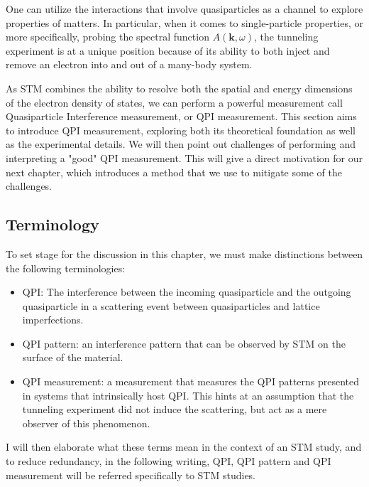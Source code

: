 One can utilize the interactions that involve quasiparticles as a channel to explore properties of matters. In particular, when it comes to single-particle properties, or more specifically, probing the spectral function $A(\textbf{k},\omega)$, the tunneling experiment is at a unique position because of its ability to both inject and remove an electron into and out of a many-body system.  

As \ac{STM} combines the ability to resolve both the spatial and energy dimensions of the electron density of states, we can perform a powerful measurement call Quasiparticle Interference measurement, or \ac{QPI} measurement. This section aims to introduce \ac{QPI} measurement, exploring both its theoretical foundation as well as the experimental details. We will then point out challenges of performing and interpreting a "good" \ac{QPI} measurement. This will give a direct motivation for our next chapter, which introduces a method that we use to mitigate some of the challenges. 

\subsection{Terminology}
To set stage for the discussion in this chapter, we must make distinctions between the following terminologies: 
\begin{itemize}
	\item QPI: The interference between the incoming quasiparticle and the outgoing quasiparticle in a scattering event between quasiparticles and lattice imperfections.  
	\item QPI pattern: an interference pattern that can be observed by \ac{STM} on the surface of the material.
	\item QPI measurement: a measurement that measures the QPI patterns presented in systems that intrinsically host QPI. This hints at an assumption that the tunneling experiment did not induce the scattering, but act as a mere observer of this phenomenon.
\end{itemize}
I will then elaborate what these terms mean in the context of an STM study, and to reduce redundancy, in the following writing, QPI, QPI pattern and QPI measurement will be referred specifically to STM studies.

